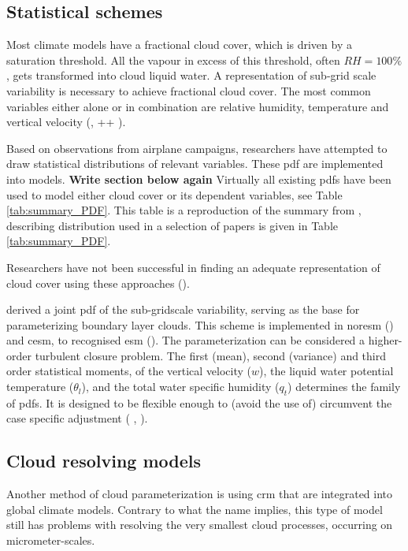 \subsection{Statistical schemes}
Most climate models have a fractional cloud cover, which is driven by a saturation threshold. All the vapour in excess of this threshold, often $RH=100\%$, gets transformed into cloud liquid water. A representation of sub-grid scale variability is necessary to achieve fractional cloud cover. The most common variables either alone or in combination are relative humidity, temperature and vertical velocity (\cite{Golaz2002_part1}, ++ ). 

Based on observations from airplane campaigns, researchers have attempted to draw statistical distributions of relevant variables. These \acrfull{pdf} are implemented into models. 
\textbf{Write section below again}
Virtually all existing \acrshort{pdf}s have been used to model either cloud cover or its dependent variables, see Table \ref{tab:summary_PDF}. This table is a reproduction of the summary from , describing distribution used in a selection of papers is given in Table \ref{tab:summary_PDF}.

Researchers have not been successful in finding an adequate representation of cloud cover using these approaches (\cite{Tompkins2009CloudParametrization}). 

 derived a joint \acrshort{pdf} of the sub-gridscale variability, serving as the base for parameterizing boundary layer clouds. This scheme is implemented in \acrfull{noresm} (\cite{SelandNORESM}) and \acrfull{cesm}, to recognised \acrshort{esm} (\cite{DanabasogluCESM}).
The parameterization can be considered a higher-order turbulent closure problem. The first (mean), second (variance) and third order statistical moments, of the vertical velocity ($w$), the liquid water potential temperature ($\theta_l$), and the total water specific humidity ($q_t$) determines the family of \acrshort{pdf}s. It is designed to be flexible enough to (avoid the use of) circumvent the case specific adjustment ( \cite{Golaz2002_part1},  \cite{Golaz2002_part2}). 

\subsection{Cloud resolving models} \label{sec:params_climate_models}
Another method of cloud parameterization is using \acrfull{crm} that are integrated into global climate models. Contrary to what the name implies, this type of model still has problems with resolving the very smallest cloud processes, occurring on micrometer-scales. 

